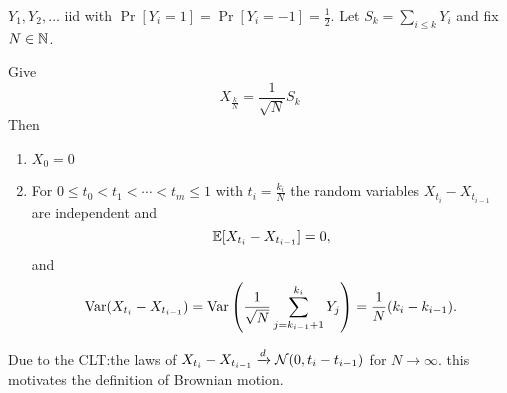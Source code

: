 \documentclass[../chapter01.tex]{subfile}
\begin{document}
$Y_{1}, Y_{2}, \ldots$ iid with $\Pr[Y_{i} = 1] = \Pr[Y_{i}=-1] = \frac{1}{2}$. Let $S_{k} = \sum_{i\le k}Y_{i}$ and fix $N \in \mathbb{N}$. 

Give 
\begin{equation}
X_{\frac{k}{N}} = \frac{1}{\sqrt{N}}S_k
\end{equation}
Then 
\begin{enumerate}
  \item $X_0 = 0$
  \item For $0\le t_0 < t_1 < \cdots < t_m \le 1$ with $t_i = \frac{k_i}{N}$ the random variables $X_{t_i} - X_{t_{i-1}}$
    are independent and 
    \begin{equation}
      \mathbb{E}[X_{t_i} - X_{t_{i-1}}] = 0,
    \end{equation} and 
    \begin{equation}
      \operatorname{Var}(X_{t_i}-X_{t_{i-1}}) = \operatorname{Var}\left(\frac{1}{\sqrt{N}}\sum_{j={k_{i-1}+1}}^{k_{i}}Y_{j}\right) = \frac{1}{N}(k_{i}-k_{i-1}).
    \end{equation}
\end{enumerate}
Due to the CLT:\@ the laws of $X_{t_i}-X_{t_{i-1}} \xrightarrow{d}\mathcal{N}(0, t_{i}-t_{i-1})$ for $N\to \infty$.
this motivates the definition of Brownian motion.
\end{document}
